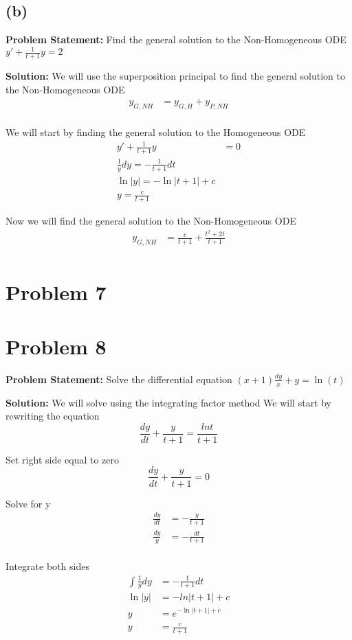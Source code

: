 \documentclass[12pt, letterpaper]{article}
\begin{document}
\subsection*{(b)}
\textbf{Problem Statement:} Find the general solution to the Non-Homogeneous ODE $y' + \frac{1}{t+1}y = 2$

\textbf{Solution:} We will use the superposition principal to find the general solution to the Non-Homogeneous ODE
\begin{align*}
y_{G,NH} &= y_{G,H} + y_{P,NH} \\
\end{align*}

We will start by finding the general solution to the Homogeneous ODE
\begin{align*}
y' + \frac{1}{t+1}y &= 0 \\
\frac{1}{y}dy = -\frac{1}{t+1}dt \\
\ln|y| = -\ln|t+1| + c \\
y = \frac{c}{t+1}
\end{align*}

Now we will find the general solution to the Non-Homogeneous ODE
\begin{align*}
y_{G,NH} &= \frac{c}{t+1} + \frac{t^2 + 2t}{t+1} \\
\end{align*}

\section*{Problem 7}

\section*{Problem 8}
\textbf{Problem Statement:} Solve the differential equation $(x+1)\frac{dy}{x}+y = \ln(t)$

\textbf{Solution:} We will solve using the integrating factor method
We will start by rewriting the equation
\[
\frac{dy}{dt} + \frac{y}{t+1} = \frac{lnt}{t+1}
\]

Set right side equal to zero
\[
\frac{dy}{dt} + \frac{y}{t+1} = 0
\]

Solve for y
\begin{align*}
\frac{dy}{dt} &= -\frac{y}{t+1} \\
\frac{dy}{y} &= -\frac{dt}{t+1} \\
\end{align*}

Integrate both sides
\begin{align*}
\int \frac{1}{y} dy &= -\frac{1}{t+1} dt \\
\ln|y| &= -ln|t+1| + c \\
y &= e^{-\ln|t+1| + c} \\
y&= \frac{c}{t+1}
\end{align*}
\end{document}
